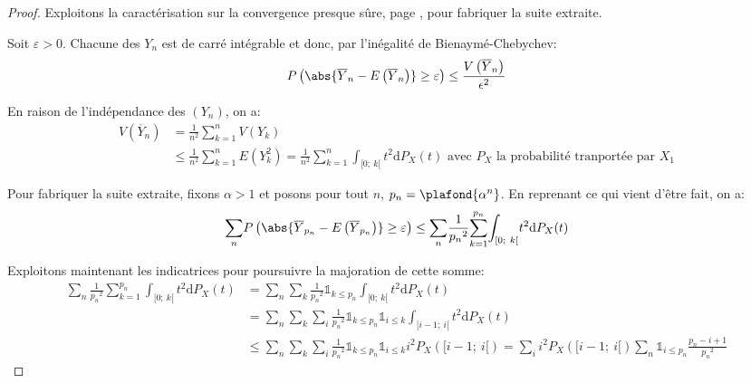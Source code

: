 \begin{proof}
Exploitons la caractérisation sur la convergence presque sûre, page \pageref{caracterisation_convergence_ps}, pour fabriquer la suite extraite. 

Soit $\varepsilon>0$. Chacune des $Y_n$ est de carré intégrable et donc, par l'inégalité de Bienaymé-Chebychev:
\[
P \left ( \abs{\overline{Y}_n - E \left ( \overline{Y}_n \right )} \geq \varepsilon
 \right ) \leq \dfrac{V \left ( \overline{Y}_n \right )}{\epsilon^2}
\]

En raison de l'indépendance des $(Y_n)$, on a:
\begin{align*}
V \left ( \overline{Y}_n\right ) & = \frac{1}{n^2} \displaystyle{\sum_{k=1}^n} V(Y_k) \\
 & \leq \frac{1}{n^2} \displaystyle{\sum_{k=1}^n} E(Y_k^2) =  \frac{1}{n^2} \displaystyle{\sum_{k=1}^n} \displaystyle{\int_{[0;~k[}} t^2 \mathrm d P_X(t) \text{ avec }P_X \text{ la probabilité tranportée par }X_1
\end{align*}

Pour fabriquer la suite extraite, fixons $\alpha > 1$ et posons pour tout $n$, $p_n = \plafond{\alpha^n}$. En reprenant ce qui vient d'être fait, on a:
\[
\displaystyle{\sum \limits_n} P \left ( \abs{\overline{Y}_{p_n} - E \left ( \overline{Y}_{p_n} \right )} \geq \varepsilon
 \right ) \leq \displaystyle{\sum \limits_n} \frac{1}{{p_n}^2} \displaystyle{\sum_{k=1}^{p_n}} \displaystyle{\int_{[0;~k[}} t^2 \mathrm d P_X(t)
\]

Exploitons maintenant les indicatrices pour poursuivre la majoration de cette somme:
\begin{align*}
\displaystyle{\sum \limits_n} \frac{1}{{p_n}^2} \displaystyle{\sum_{k=1}^{p_n}} \displaystyle{\int_{[0;~k[}} t^2 \mathrm d P_X(t) & = \displaystyle{\sum \limits_n} \displaystyle{\sum \limits_k} \frac{1}{{p_n}^2} \mathbb{1}_{k \leq p_n} \displaystyle{\int_{[0;~k[}} t^2 \mathrm d P_X(t) \\
 & = \displaystyle{\sum \limits_n} \displaystyle{\sum \limits_k} \displaystyle{\sum \limits_i} \frac{1}{{p_n}^2} \mathbb{1}_{k \leq p_n} \mathbb{1}_{i \leq k}  \displaystyle{\int_{[i-1;~i[}} t^2 \mathrm d P_X(t) \\
 & \leq \displaystyle{\sum \limits_n} \displaystyle{\sum \limits_k} \displaystyle{\sum \limits_i} \frac{1}{{p_n}^2} \mathbb{1}_{k \leq p_n} \mathbb{1}_{i \leq k} i^2 P_X\left ([i-1;~i[ \right ) = \displaystyle{\sum \limits_i} i^2 P_X\left ([i-1;~i[ \right ) \displaystyle{\sum \limits_n} \mathbb{1}_{i \leq p_n} \frac{p_n-i+1}{{p_n}^2}
\end{align*}


\end{proof}
